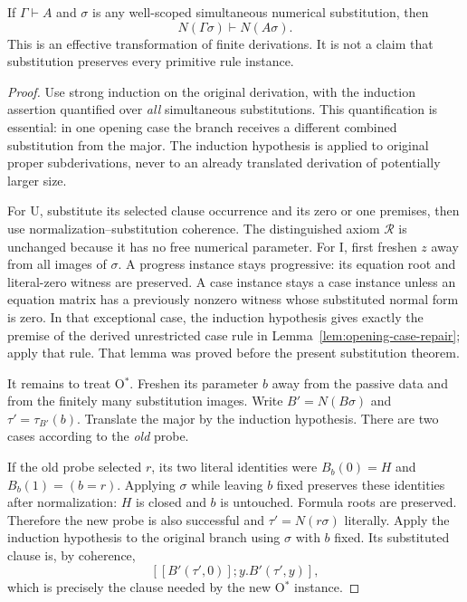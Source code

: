 \begin{theorem}
\label{thm:opening-substitution}
If $\Gamma\vdash A$ and $\sigma$ is any well-scoped simultaneous
numerical substitution, then
\[
 N(\Gamma\sigma)\vdash N(A\sigma).
\]
This is an effective transformation of finite derivations. It is not a
claim that substitution preserves every primitive rule instance.
\end{theorem}
\begin{proof}
Use strong induction on the original derivation, with the induction
assertion quantified over \emph{all} simultaneous substitutions. This
quantification is essential: in one opening case the branch receives a
different combined substitution from the major. The induction hypothesis
is applied to original proper subderivations, never to an already
translated derivation of potentially larger size.

For U, substitute its selected clause occurrence and its zero or one
premises, then use normalization--substitution coherence. The distinguished
axiom $\mathcal R$ is unchanged because it has no free numerical parameter.
For I, first freshen $z$ away from all images of $\sigma$. A progress
instance stays progressive: its equation root and literal-zero witness
are preserved. A case instance stays a case instance unless an equation
matrix has a previously nonzero witness whose substituted normal form
is zero. In that exceptional case, the induction hypothesis gives exactly
the premise of the derived unrestricted case rule in
Lemma~\ref{lem:opening-case-repair}; apply that rule. That lemma was proved
before the present substitution theorem.

It remains to treat O$^*$. Freshen its parameter $b$ away from the passive
data and from the finitely many substitution images. Write
$B'=N(B\sigma)$ and $\tau'=\tau_{B'}(b)$. Translate the major by the
induction hypothesis. There are two cases according to the \emph{old}
probe.

If the old probe selected $r$, its two literal identities were
$B_b(0)=H$ and $B_b(1)=(b=r)$. Applying $\sigma$ while leaving $b$ fixed
preserves these identities after normalization: $H$ is closed and $b$
is untouched. Formula roots are preserved. Therefore the new probe is
also successful and $\tau'=N(r\sigma)$ literally. Apply the induction
hypothesis to the original branch using $\sigma$ with $b$ fixed. Its
substituted clause is, by coherence,
\[
 [[B'(\tau',0)];y.B'(\tau',y)],
\]
which is precisely the clause needed by the new O$^*$ instance.


\end{proof}
